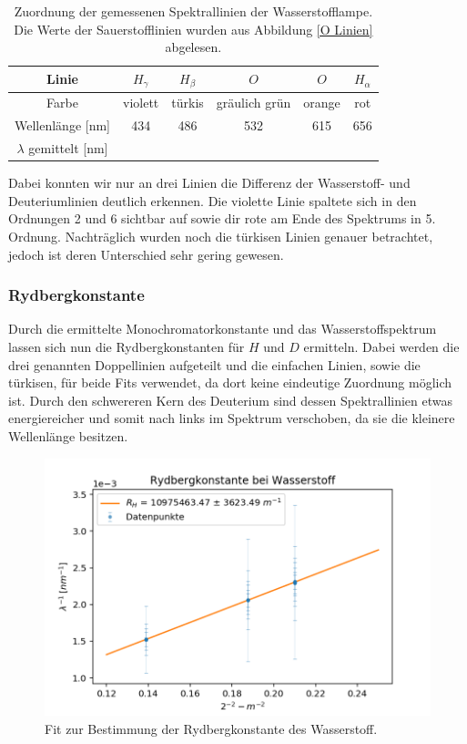 \documentclass[]{article}
\begin{document}
\begin{table}[H]
	\centering
	\begin{tabular}{c|c|c|c|c|c}
		Linie & $H_\gamma$ & $H_\beta$ & $O$ & $O$ & $H_\alpha$ \\
		\hline
		Farbe & violett & türkis & gräulich grün & orange & rot \\
		\hline
		Wellenlänge [nm]  & 434 & 486 & 532 & 615 & 656 \\
		\hline
		\hline
		$\lambda$ gemittelt [nm] & & & && \\		
	\end{tabular}
	\caption{Zuordnung der gemessenen Spektrallinien der Wasserstofflampe. Die Werte der Sauerstofflinien wurden aus Abbildung \ref{O Linien} abgelesen. }
\end{table}

Dabei konnten wir nur an drei Linien die Differenz der Wasserstoff- und Deuteriumlinien deutlich erkennen. Die violette Linie spaltete sich in den Ordnungen 2 und 6 sichtbar auf sowie dir rote am Ende des Spektrums in 5. Ordnung. Nachträglich wurden noch die türkisen Linien genauer betrachtet, jedoch ist deren Unterschied sehr gering gewesen.


\subsubsection{Rydbergkonstante}
Durch die ermittelte Monochromatorkonstante und das Wasserstoffspektrum lassen sich nun die Rydbergkonstanten für $H$ und $D$ ermitteln. Dabei werden die drei genannten Doppellinien aufgeteilt und die einfachen Linien, sowie die türkisen, für beide Fits verwendet, da dort keine eindeutige Zuordnung möglich ist. Durch den schwereren Kern des Deuterium sind dessen Spektrallinien etwas energiereicher und somit nach links im Spektrum verschoben, da sie die kleinere Wellenlänge besitzen. 

\begin{figure}[H]
\centering
\includegraphics[width=1\textwidth]{Plots/R_H.png}
\caption{ Fit zur Bestimmung der Rydbergkonstante des Wasserstoff.}
\label{fig:Rydberg H}
\end{figure}
\end{document}
